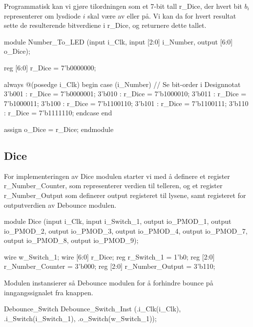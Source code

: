 Programmatisk kan vi gjøre tilordningen som et 7-bit tall r\_Dice, der hvert bit 
$b_i$ representerer om lysdiode $i$ skal være av eller på. Vi kan da for hvert resultat 
sette de resulterende bitverdiene i r\_Dice, og returnere dette tallet. 
\begin{verilogcode}
    module Number_To_LED
        (input i_Clk,
        input [2:0] i_Number,
        output [6:0] o_Dice);

     reg [6:0] r_Dice = 7'b0000000;

     always @(posedge i_Clk)
     begin
         case (i_Number) // Se bit-order i Designnotat 
             3'b001 : r_Dice = 7'b0000001;
             3'b010 : r_Dice = 7'b1000010;
             3'b011 : r_Dice = 7'b1000011;
             3'b100 : r_Dice = 7'b1100110;
             3'b101 : r_Dice = 7'b1100111;
             3'b110 : r_Dice = 7'b1111110;
         endcase
     end

     assign o_Dice = r_Dice;
    endmodule
\end{verilogcode}

\subsection{Dice}
For implementeringen av Dice modulen starter vi med å definere et register r\_Number\_Counter,
som representerer verdien til telleren, og et register r\_Number\_Output som definerer 
output registeret til lysene, samt registeret for outputverdien av Debounce modulen.
\begin{verilogcode}
 module Dice
    (input i_Clk, input i_Switch_1,
     output io_PMOD_1, output io_PMOD_2,
     output io_PMOD_3, output io_PMOD_4,
     output io_PMOD_7, output io_PMOD_8,
     output io_PMOD_9);

 wire       w_Switch_1;
 wire [6:0] r_Dice;
 reg        r_Switch_1 = 1'b0;
 reg  [2:0] r_Number_Counter = 3'b000;
 reg  [2:0] r_Number_Output = 3'b110;
   
\end{verilogcode}

Modulen instansierer så Debounce modulen for å forhindre bounce på 
inngangssignalet fra knappen. 
\begin{verilogcode}
  Debounce_Switch Debounce_Switch_Inst
    (.i_Clk(i_Clk),
     .i_Switch(i_Switch_1),
     .o_Switch(w_Switch_1));
\end{verilogcode}

